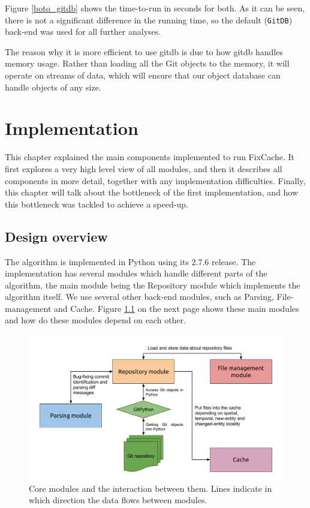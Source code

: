 \documentclass[12pt,twoside,notitlepage]{report}
\newcommand{\fxch}{FixCache}
\begin{document}
Figure \ref{boto_gitdb} shows the time-to-run in seconds for both. As it can be seen, there is not a significant difference in the running time, so the default (\texttt{GitDB}) back-end was used for all further analyses.

The reason why it is more efficient to use gitdb is due to how gitdb handles memory usage. Rather than loading all the Git objects to the memory, it will operate on streams of data, which will ensure that our object database can handle objects of any size.
\cleardoublepage
\chapter{Implementation}
This chapter explained the main components implemented to run \fxch{}. It first explores a very high level view of all modules, and then it describes all components in more detail, together with any implementation difficulties. Finally, this chapter will talk about the bottleneck of the first implementation, and how this bottleneck was tackled to achieve a speed-up.
\section{Design overview}

The algorithm is implemented in Python using its 2.7.6 release. The implementation has several modules which handle different parts of the algorithm, the main module being the Repository module which implements the algorithm itself. We use several other back-end modules, such as Parsing, File-management and Cache. Figure \ref{fixcache_flowgraph} on the next page shows these main modules and how do these modules depend on each other.

\begin{figure}[h]
\includegraphics[width=1.0\textwidth]{fixcache_flowgraph.png}

\captionsetup{width=0.9\textwidth}
\caption[Core modules and the interaction between them.]{Core modules and the interaction between them. Lines indicate in which direction the data flows between modules.}
\label{fixcache_flowgraph}
\end{figure} 
\end{document}
